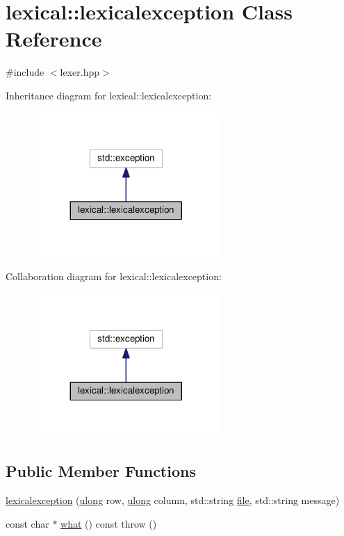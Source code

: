 \hypertarget{classlexical_1_1lexicalexception}{}\section{lexical\+:\+:lexicalexception Class Reference}
\label{classlexical_1_1lexicalexception}


{\ttfamily \#include $<$lexer.\+hpp$>$}



Inheritance diagram for lexical\+:\+:lexicalexception\+:\nopagebreak
\begin{figure}[H]
\begin{center}
\leavevmode
\includegraphics[width=200pt]{classlexical_1_1lexicalexception__inherit__graph}
\end{center}
\end{figure}


Collaboration diagram for lexical\+:\+:lexicalexception\+:\nopagebreak
\begin{figure}[H]
\begin{center}
\leavevmode
\includegraphics[width=200pt]{classlexical_1_1lexicalexception__coll__graph}
\end{center}
\end{figure}
\subsection*{Public Member Functions}
\begin{DoxyCompactItemize}
\item 
\hyperlink{classlexical_1_1lexicalexception_a669fdad5e3c9cfc1404b3cff07f2cc2c}{lexicalexception} (\hyperlink{types_8h_ab2bb0e5480d1d957383df6b350794313}{ulong} row, \hyperlink{types_8h_ab2bb0e5480d1d957383df6b350794313}{ulong} column, std\+::string \hyperlink{classlexical_1_1lexicalexception_a19c8e9b165ad5d2250d2a26c920462e3}{file}, std\+::string message)
\item 
const char $\ast$ \hyperlink{classlexical_1_1lexicalexception_a9d12fd196a80d2be20dfa616c063ffb4}{what} () const   throw ()
\end{DoxyCompactItemize}
